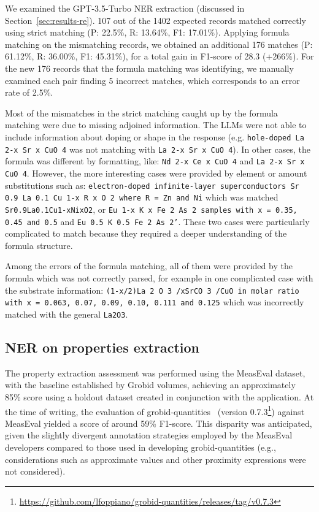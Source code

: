 We examined the GPT-3.5-Turbo NER extraction (discussed in Section~\ref{sec:results-re}). 107 out of the 1402 expected records matched correctly using strict matching (P: 22.5\%, R: 13.64\%, F1: 17.01\%). Applying formula matching on the mismatching records, we obtained an additional 176 matches (P: 61.12\%, R: 36.00\%, F1: 45.31\%), for a total gain in F1-score of 28.3 (+266\%). 
For the new 176 records that the formula matching was identifying, we manually examined each pair finding 5 incorrect matches, which corresponds to an error rate of 2.5\%. 

Most of the mismatches in the strict matching caught up by the formula matching were due to missing adjoined information. 
The LLMs were not able to include information about doping or shape in the response (e.g. \texttt{hole-doped La 2-x Sr x CuO 4} was not matching with \texttt{La 2-x Sr x CuO 4}). 
In other cases, the formula was different by formatting, like: \texttt{Nd 2-x Ce x CuO 4} and \texttt{La 2-x Sr x CuO 4}.
However, the more interesting cases were provided by element or amount substitutions such as: \texttt{electron-doped infinite-layer superconductors Sr 0.9 La 0.1 Cu 1-x R x O 2 where R = Zn and Ni} which was matched \texttt{Sr0.9La0.1Cu1-xNixO2}, or \texttt{Eu 1-x K x Fe 2 As 2 samples with x = 0.35, 0.45 and 0.5} and \texttt{Eu 0.5 K 0.5 Fe 2 As 2'}. These two cases were particularly complicated to match because they required a deeper understanding of the formula structure. 

Among the errors of the formula matching, all of them were provided by the formula which was not correctly parsed, for example in one complicated case with the substrate information: \texttt{(1-x/2)La 2 O 3 /xSrCO 3 /CuO in molar ratio with x = 0.063, 0.07, 0.09, 0.10, 0.111 and 0.125} which was incorrectly matched with the general \texttt{La2O3}.


\subsection{NER on properties extraction}
\label{sec:results-ner-properties}

The property extraction assessment was performed using the MeasEval dataset, with the baseline established by Grobid volumes, achieving an approximately 85\% score using a holdout dataset created in conjunction with the application. 
At the time of writing, the evaluation of grobid-quantities~\cite{foppiano2019quantities} (version 0.7.3\footnote{\url{https://github.com/lfoppiano/grobid-quantities/releases/tag/v0.7.3}}) against MeasEval yielded a score of around 59\% F1-score. This disparity was anticipated, given the slightly divergent annotation strategies employed by the MeasEval developers compared to those used in developing grobid-quantities (e.g., considerations such as approximate values and other proximity expressions were not considered). 

